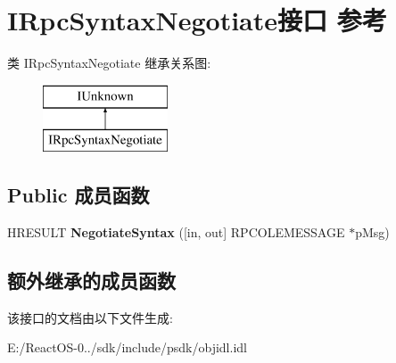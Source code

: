 \hypertarget{interface_i_rpc_syntax_negotiate}{}\section{I\+Rpc\+Syntax\+Negotiate接口 参考}
\label{interface_i_rpc_syntax_negotiate}
类 I\+Rpc\+Syntax\+Negotiate 继承关系图\+:\begin{figure}[H]
\begin{center}
\leavevmode
\includegraphics[height=2.000000cm]{interface_i_rpc_syntax_negotiate}
\end{center}
\end{figure}
\subsection*{Public 成员函数}
\begin{DoxyCompactItemize}
\item 
\mbox{\label{interface_i_rpc_syntax_negotiate_a38789c39f6a05c59a8645330981a6f63}} 
H\+R\+E\+S\+U\+LT {\bfseries Negotiate\+Syntax} (\mbox{[}in, out\mbox{]} R\+P\+C\+O\+L\+E\+M\+E\+S\+S\+A\+GE $\ast$p\+Msg)
\end{DoxyCompactItemize}
\subsection*{额外继承的成员函数}


该接口的文档由以下文件生成\+:\begin{DoxyCompactItemize}
\item 
E\+:/\+React\+O\+S-\/0../sdk/include/psdk/objidl.\+idl\end{DoxyCompactItemize}
